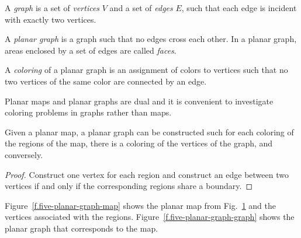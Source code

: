 \begin{figure}[t]
{
}
\label{f.five-planar-map-five}
\label{f.five-planar-map-four}
\end{figure}

\begin{definition}
A \emph{graph} is a set of \emph{vertices} $V$ and a set of \emph{edges} $E$, such that each edge is incident with exactly two vertices.

A \emph{planar graph} is a graph such that no edges cross each other. In a planar graph, areas enclosed by a set of edges are called \emph{faces}.

A \emph{coloring} of a planar graph is an assignment of colors to vertices such that no two vertices of the same color are connected by an edge.
\end{definition}

Planar maps and planar graphs are dual and it is convenient to investigate coloring problems in graphs rather than maps.

\begin{theorem}
Given a planar map, a planar graph can be constructed such for each coloring of the regions of the map, there is a coloring of the vertices of the graph, and conversely.
\end{theorem}

\begin{proof}
Construct one vertex for each region and construct an edge between two vertices if and only if the corresponding regions share a boundary. 
\end{proof}

\begin{example}
Figure~\ref{f.five-planar-graph-map} shows the planar map from Fig.~\ref{f.five-planar-map-four} and the vertices associated with the regions. Figure~\ref{f.five-planar-graph-graph} shows the planar graph that corresponds to the map.
\end{example}

